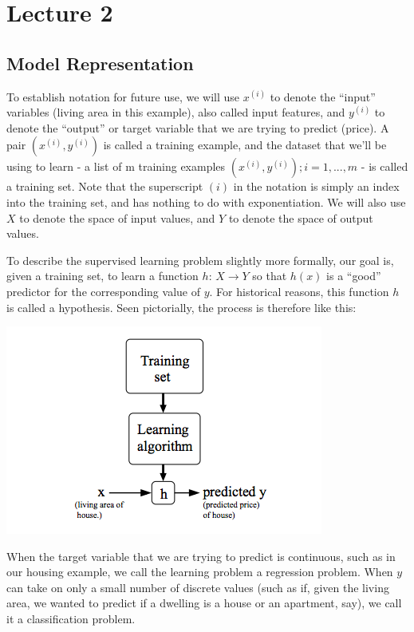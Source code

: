 \documentclass[UTF8]{article}
\begin{document}
\newpage

\section{Lecture 2}

\subsection{Model Representation}

To establish notation for future use, we will use $x^{(i)}$ to denote the ``input'' variables (living area in this example), also called input features, and $y^{(i)}$ to denote the ``output'' or target variable that we are trying to predict (price). A pair $(x^{(i)},y^{(i)})$ is called a training example, and the dataset that we'll be using to learn - a list of m training examples $(x^{(i)},y^{(i)}); i=1,...,m$ - is called a training set. Note that the superscript $(i)$ in the notation is simply an index into the training set, and has nothing to do with exponentiation. We will also use $X$ to denote the space of input values, and $Y$ to denote the space of output values.

To describe the supervised learning problem slightly more formally, our goal is, given a training set, to learn a function $h$: $X \to Y$ so that $h(x)$ is a ``good'' predictor for the corresponding value of $y$. For historical reasons, this function $h$ is called a hypothesis. Seen pictorially, the process is therefore like this:

\includegraphics[width = \textwidth]{NotePics/2_1_1.png}

When the target variable that we are trying to predict is continuous, such as in our housing example, we call the learning problem a regression problem. When $y$ can take on only a small number of discrete values (such as if, given the living area, we wanted to predict if a dwelling is a house or an apartment, say), we call it a classification problem.
\end{document}
